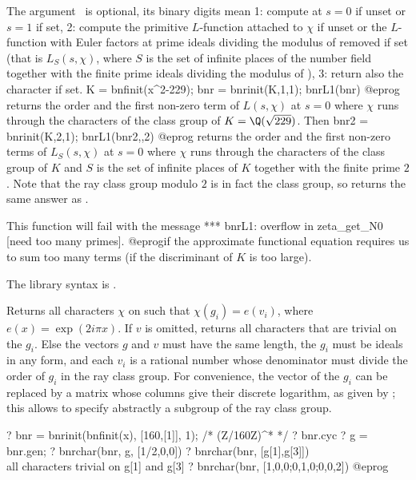 The argument \fl\ is optional, its binary digits
mean 1: compute at $s = 0$ if unset or $s = 1$ if set, 2: compute the
primitive $L$-function attached to $\chi$ if unset or the $L$-function
with Euler factors at prime ideals dividing the modulus of  removed
if set (that is $L_S(s, \chi)$, where $S$ is the
set of infinite places of the number field together with the finite prime
ideals dividing the modulus of ), 3: return also the character if
set.
\bprog
K = bnfinit(x^2-229);
bnr = bnrinit(K,1,1);
bnrL1(bnr)
@eprog\noindent
returns the order and the first non-zero term of $L(s, \chi)$ at $s = 0$
where $\chi$ runs through the characters of the class group of
$K = \Q(\sqrt{229})$. Then
\bprog
bnr2 = bnrinit(K,2,1);
bnrL1(bnr2,,2)
@eprog\noindent
returns the order and the first non-zero terms of $L_S(s, \chi)$ at $s = 0$
where $\chi$ runs through the characters of the class group of $K$ and $S$ is
the set of infinite places of $K$ together with the finite prime $2$. Note
that the ray class group modulo $2$ is in fact the class group, so
 returns the same answer as .

This function will fail with the message
\bprog
 *** bnrL1: overflow in zeta_get_N0 [need too many primes].
@eprog\noindent if the approximate functional equation requires us to sum
too many terms (if the discriminant of $K$ is too large).

The library syntax is .

\label{se:bnrchar}
Returns all characters $\chi$ on  such that
$\chi(g_i) = e(v_i)$, where $e(x) = \exp(2i\pi x)$. If $v$ is omitted,
returns all characters that are trivial on the $g_i$. Else the vectors $g$
and $v$ must have the same length, the $g_i$ must be ideals in any form, and
each $v_i$ is a rational number whose denominator must divide the order of
$g_i$ in the ray class group. For convenience, the vector of the $g_i$
can be replaced by a matrix whose columns give their discrete logarithm,
as given by ; this allows to specify abstractly a
subgroup of the ray class group.

\bprog
? bnr = bnrinit(bnfinit(x), [160,[1]], 1); /* (Z/160Z)^* */
? bnr.cyc
? g = bnr.gen;
? bnrchar(bnr, g, [1/2,0,0])
? bnrchar(bnr, [g[1],g[3]]) \\ all characters trivial on g[1] and g[3]
? bnrchar(bnr, [1,0,0;0,1,0;0,0,2])
@eprog

